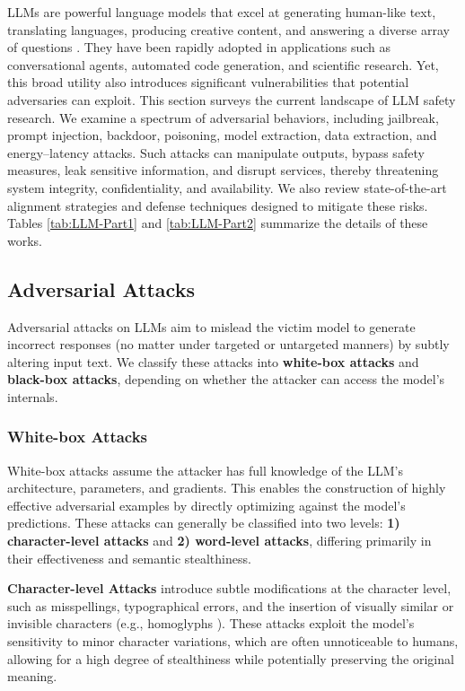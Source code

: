 LLMs are powerful language models that excel at generating human-like text, translating languages, producing creative content, and answering a diverse array of questions \cite{openai-o1,guo2025deepseek}. They have been rapidly adopted in applications such as conversational agents, automated code generation, and scientific research. Yet, this broad utility also introduces significant vulnerabilities that potential adversaries can exploit.
This section surveys the current landscape of LLM safety research. We examine a spectrum of adversarial behaviors, including jailbreak, prompt injection, backdoor, poisoning, model extraction, data extraction, and energy–latency attacks. Such attacks can manipulate outputs, bypass safety measures, leak sensitive information, and disrupt services, thereby threatening system integrity, confidentiality, and availability. We also review state-of-the-art alignment strategies and defense techniques designed to mitigate these risks. Tables \ref{tab:LLM-Part1} and \ref{tab:LLM-Part2} summarize the details of these works.
	

\subsection{Adversarial Attacks} \label{sec:llm_adversarial_attack}

Adversarial attacks on LLMs aim to mislead the victim model to generate incorrect responses (no matter under targeted or untargeted manners) by subtly altering input text.
We classify these attacks into \textbf{white-box attacks} and \textbf{black-box attacks}, depending on whether the attacker can access the model’s internals.

\subsubsection{White-box Attacks}
White-box attacks assume the attacker has full knowledge of the LLM's architecture, parameters, and gradients. This enables the construction of highly effective adversarial examples by directly optimizing against the model's predictions. These attacks can generally be classified into two levels: \textbf{1) character-level attacks} and \textbf{2) word-level attacks}, differing primarily in their effectiveness and semantic stealthiness.

\textbf{Character-level Attacks} introduce subtle modifications at the character level, such as misspellings, typographical errors, and the insertion of visually similar or invisible characters (e.g., homoglyphs \cite{boucher2022bad}). These attacks exploit the model’s sensitivity to minor character variations, which are often unnoticeable to humans, allowing for a high degree of stealthiness while potentially preserving the original meaning. 

